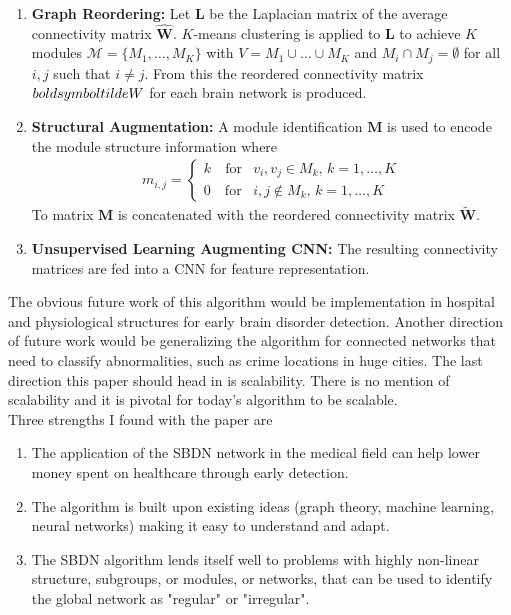 \documentclass[12pt]{article}
\theoremstyle{remark}
\begin{document}
	\begin{enumerate}
		\item \textbf{Graph Reordering:} Let $\boldsymbol{L}$ be the Laplacian matrix of the average connectivity matrix $\boldsymbol{\hat{W}}$. $K$-means clustering is applied to $\boldsymbol{L}$ to achieve $K$ modules $\mathcal{M} = \{M_1, \dots, M_K\}$ with $V = M_1 \cup \dots \cup M_K$ and $M_i \cap M_j = \emptyset$ for all $i, j$ such that $i \neq j$. From this the reordered connectivity matrix $\\boldsymbol{tilde{W}}$ for each brain network is produced.
		\item \textbf{Structural Augmentation:} A module identification $\boldsymbol{M}$ is used to encode the module structure information where 
		\begin{align*}
		m_{i,j} = 
		\begin{cases}
		k \quad \text{for} & v_i, v_j \in M_k, \, k = 1, \dots, K \\
		0 \quad \text{for} & i,j \not\in M_k , \, k = 1, \dots, K
		\end{cases}
		\end{align*}
		To matrix $\boldsymbol{M}$ is concatenated with the reordered connectivity matrix $\boldsymbol{\tilde{W}}$.
		\item \textbf{Unsupervised Learning Augmenting CNN:} The resulting connectivity matrices are fed into a CNN for feature representation. 
	\end{enumerate}
	
	The obvious future work of this algorithm would be implementation in hospital and physiological structures for early brain disorder detection. Another direction of future work would be generalizing the algorithm for connected networks that need to classify abnormalities, such as crime locations in huge cities. The last direction this paper should head in is scalability. There is no mention of scalability and it is pivotal for today's algorithm to be scalable. \\
	
	Three strengths I found with the paper are
	\begin{enumerate}
		\item The application of the SBDN network in the medical field can help lower money spent on healthcare through early detection. 
		\item The algorithm is built upon existing ideas (graph theory, machine learning, neural networks) making it easy to understand and adapt. 
		\item The SBDN algorithm lends itself well to problems with highly non-linear structure, subgroups, or modules, or networks, that can be used to identify the global network as "regular" or "irregular". 
	\end{enumerate} 
	\vspace{0.5cm}
	
\end{document}
